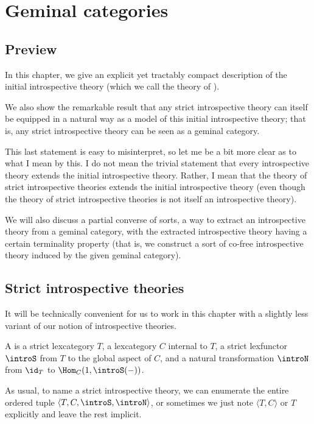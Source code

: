 \filestart

\section{Geminal categories}\label{GeminalChapter}
\subsection{Preview}
In this chapter, we give an explicit yet tractably compact description of the initial introspective theory (which we call the theory of ).

We also show the remarkable result that any strict introspective theory can itself be equipped in a natural way as a model of this initial introspective theory; that is, any strict introspective theory can be seen as a geminal category.

This last statement is easy to misinterpret, so let me be a bit more clear as to what I mean by this. I do not mean the trivial statement that every introspective theory extends the initial introspective theory. Rather, I mean that the theory of strict introspective theories extends the initial introspective theory (even though the theory of strict introspective theories is not itself an introspective theory).

We will also discuss a partial converse of sorts, a way to extract an introspective theory from a geminal category, with the extracted introspective theory having a certain terminality property (that is, we construct a sort of co-free introspective theory induced by the given geminal category).

\subsection{Strict introspective theories}
It will be technically convenient for us to work in this chapter with a slightly less  variant of our notion of introspective theories.

\begin{definition}
A  is a strict lexcategory $T$, a lexcategory $C$ internal to $T$, a strict lexfunctor $\introS$ from $T$ to the global aspect of $C$, and a natural transformation $\introN$ from $\id_T$ to $\Hom_C(1, \introS(-))$.
\end{definition}

As usual, to name a strict introspective theory, we can enumerate the entire ordered tuple $\langle T, C, \introS, \introN \rangle$, or sometimes we just note $\langle T, C \rangle$ or $T$ explicitly and leave the rest implicit.

